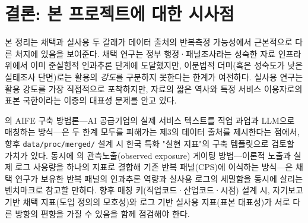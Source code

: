 \documentclass[11pt]{article}
\begin{document}
\section{결론: 본 프로젝트에 대한 시사점}
\label{sec:conclusion}

본 정리는 채택과 실사용 두 갈래가 데이터 출처의 반복측정 가능성에서 근본적으로 다른 처지에 있음을 보여준다. 채택 연구는 정부 행정·패널조사라는 성숙한 자료 인프라 위에서 이미 준실험적 인과추론 단계에 도달했지만, 이분법적 더미(혹은 성숙도가 낮은 실태조사 단면)로는 활용의 \emph{강도}를 구분하지 못한다는 한계가 여전하다. 실사용 연구는 활용 강도를 가장 직접적으로 포착하지만, 자료의 짧은 역사와 특정 서비스 이용자로의 표본 국한이라는 이중의 대표성 문제를 안고 있다.

\citet{cheon-2025-ai-exposure-vs-ai-adoption}의 AIFE 구축 방법론—AI 공급기업의 실제 서비스 텍스트를 직업 과업과 LLM으로 매칭하는 방식—은 두 한계 모두를 피해가는 제3의 데이터 출처를 제시한다는 점에서, 향후 \texttt{data/proc/merged/} 설계 시 한국 특화 "실현 지표"의 구축 템플릿으로 검토할 가치가 있다. 동시에 \citet{massenkoff-2026-labor-market-impacts-of-ai}의 관측노출(observed exposure) 게이팅 방법—이론적 노출과 실제 로그 사용량을 하나의 지표로 결합해 기존 반복 패널(CPS)에 이식하는 방식—은 채택 연구가 보유한 반복 패널의 인과추론 역량과 실사용 로그의 세밀함을 동시에 살리는 벤치마크로 참고할 만하다. 향후 매칭 키(직업코드·산업코드·시점) 설계 시, 자기보고 기반 채택 지표(도입 정의의 모호성)와 로그 기반 실사용 지표(표본 대표성)가 서로 다른 방향의 편향을 가질 수 있음을 함께 점검해야 한다.

\clearpage
\printbibliography
\end{document}
